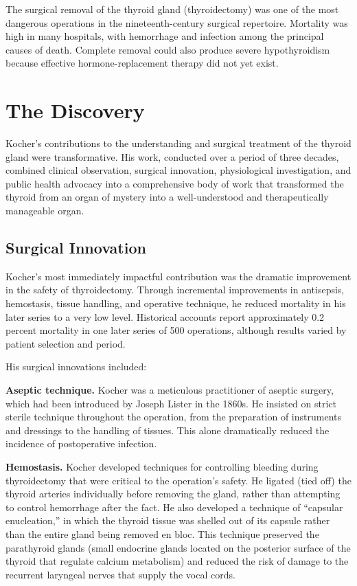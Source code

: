 The surgical removal of the thyroid gland (thyroidectomy) was one of the most dangerous operations in the nineteenth-century surgical repertoire. Mortality was high in many hospitals, with hemorrhage and infection among the principal causes of death. Complete removal could also produce severe hypothyroidism because effective hormone-replacement therapy did not yet exist.\cite{thyroid-surgery-history}

\section{The Discovery}

Kocher's contributions to the understanding and surgical treatment of the thyroid gland were transformative. His work, conducted over a period of three decades, combined clinical observation, surgical innovation, physiological investigation, and public health advocacy into a comprehensive body of work that transformed the thyroid from an organ of mystery into a well-understood and therapeutically manageable organ.

\subsection{Surgical Innovation}

Kocher's most immediately impactful contribution was the dramatic improvement in the safety of thyroidectomy. Through incremental improvements in antisepsis, hemostasis, tissue handling, and operative technique, he reduced mortality in his later series to a very low level. Historical accounts report approximately 0.2 percent mortality in one later series of 500 operations, although results varied by patient selection and period.\cite{thyroid-surgery-history}

His surgical innovations included:

\textbf{Aseptic technique.} Kocher was a meticulous practitioner of aseptic surgery, which had been introduced by Joseph Lister in the 1860s. He insisted on strict sterile technique throughout the operation, from the preparation of instruments and dressings to the handling of tissues. This alone dramatically reduced the incidence of postoperative infection.

\textbf{Hemostasis.} Kocher developed techniques for controlling bleeding during thyroidectomy that were critical to the operation's safety. He ligated (tied off) the thyroid arteries individually before removing the gland, rather than attempting to control hemorrhage after the fact. He also developed a technique of ``capsular enucleation,'' in which the thyroid tissue was shelled out of its capsule rather than the entire gland being removed en bloc. This technique preserved the parathyroid glands (small endocrine glands located on the posterior surface of the thyroid that regulate calcium metabolism) and reduced the risk of damage to the recurrent laryngeal nerves that supply the vocal cords.

